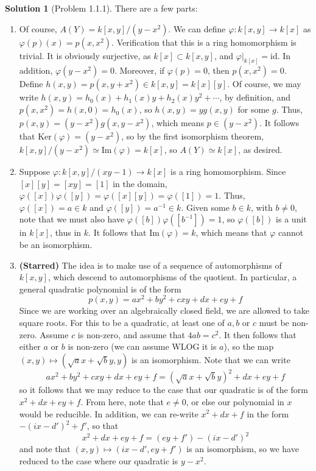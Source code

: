 \documentclass[aps,pra,showpacs,notitlepage,onecolumn,superscriptaddress,nofootinbib]{revtex4-1}
\theoremstyle{definition}
\newtheorem{solution}{Solution}[section]
\begin{document}
\begin{solution}[Problem 1.1.1]
There are a few parts:
\begin{enumerate}
  \item Of course, $A(Y) = k[x, y]/(y - x^2)$. We can define $\varphi : k[x, y] \rightarrow k[x]$ as $\varphi(p)(x) = p(x, x^2)$. Verification that this is a ring homomorphism
    is trivial. It is obviously surjective, as $k[x] \subset k[x, y]$, and $\varphi|_{k[x]} = \text{id}$. In addition, $\varphi(y - x^2) = 0$. Moreover, if $\varphi(p) = 0$, then
    $p(x, x^2) = 0$. Define $h(x, y) = p(x, y + x^2) \in k[x, y] = k[x][y]$. Of course, we may write $h(x, y) = h_0(x) + h_1(x) y + h_2(x) y^2 + \cdots$, by definition, and $p(x, x^2) = h(x, 0) = h_0(x)$,
    so $h(x, y) = y g(x, y)$ for some $g$. Thus, $p(x, y) = (y - x^2) g(x, y - x^2)$, which means $p \in (y - x^2)$. It follows that $\text{Ker}(\varphi) = (y - x^2)$, so by the first isomorphism
    theorem, $k[x, y]/(y - x^2) \simeq \text{Im}(\varphi) = k[x]$, so $A(Y) \simeq k[x]$, as desired.
    \item Suppose $\varphi : k[x, y]/(xy - 1) \rightarrow k[x]$ is a ring homomorphism. Since $[x][y] = [xy] = [1]$ in the domain, $\varphi([x]) \varphi([y]) = \varphi([x][y]) = \varphi([1]) = 1$. Thus,
      $\varphi([x]) = a \in k$ and $\varphi([y]) = a^{-1} \in k$. Given some $b \in k$, with $b \neq 0$, note that we must also have $\varphi([b]) \varphi([b^{-1}]) = 1$, so $\varphi([b])$ is a unit in $k[x]$,
      thus in $k$. It follows that $\text{Im}(\varphi) = k$, which means that $\varphi$ cannot be an isomorphism.
     \item \textbf{(Starred)} The idea is to make use of a sequence of automorphisms of $k[x, y]$, which descend to automorphisms of the quotient. In particular, a general quadratic polynomial is of the form
       \begin{equation}
         p(x, y) = a x^2 + b y^2 + cxy + dx + ey + f
         \end{equation}
       Since we are working over an algebraically closed field, we are allowed to take square roots. For this to be a quadratic, at least one of $a, b$ or $c$ must be non-zero. Assume $c$ is non-zero, and
       assume that $4ab = c^2$. It then follows that either $a$ or $b$ is non-zero (we can assume WLOG it is $a$), so the map $(x, y) \mapsto (\sqrt{a} x + \sqrt{b} y, y)$ is an isomorphism. Note that
       we can write
       \begin{equation}
         ax^2 + by^2 + cxy + dx + ey + f = (\sqrt{a} x + \sqrt{b} y)^2 + dx + ey + f
         \end{equation}
       so it follows that we may reduce to the case that our quadratic is of the form $x^2 + dx + ey + f$. From here, note that $e \neq 0$, or else our polynomial in $x$ would be reducible. In addition,
       we can re-write $x^2 + dx + f$ in the form $-(i x - d')^2 + f'$, so that
       \begin{equation}
         x^2 + dx + ey + f = (ey + f') - (i x - d')^2
         \end{equation}
       and note that $(x, y) \mapsto (ix - d', ey + f')$ is an isomorphism, so we have reduced to the case where our quadratic is $y - x^2$.


\end{enumerate}
\end{solution}
\end{document}
